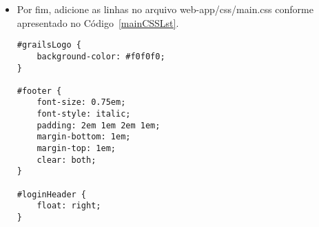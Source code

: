 \begin{itemize}
\begin{itemize}
\end{itemize}

\lstset{language=XML}
\begin{lstlisting}[numbers=left,        caption=Leiaute        padrão       {\bf
      grails-app/views/layouts/main.gsp}, frame=trBL,float=htbp, label=codMain] 
<!DOCTYPE html>
 <!--[if lt IE 7 ]> <html lang="en" class="no-js ie6"> <![endif]-->
 <!--[if IE 7 ]> <html lang="en" class="no-js ie7"> <![endif]-->
 <!--[if IE 8 ]> <html lang="en" class="no-js ie8"> <![endif]-->
 <!--[if IE 9 ]> <html lang="en" class="no-js ie9"> <![endif]-->
 <!--[if (gt IE 9)|!(IE)]><!--> <html lang="en" class="no-js"><!--<![endif]-->
 <head>
  <meta http-equiv="Content-Type" content="text/html; charset=UTF-8">
  <meta http-equiv="X-UA-Compatible" content="IE=edge,chrome=1">
  <title><g:layoutTitle default="Controle Banc^á^rio"/></title>
  <meta name="viewport" content="width=device-width, initial-scale=1.0">
  <link rel="shortcut icon" href="${resource(dir: 'images', file: 'favicon.ico')}" type="image/x-icon">
  <link rel="apple-touch-icon" href="${resource(dir: 'images', file: 'apple-touch-icon.png')}">
  <link rel="apple-touch-icon" sizes="114x114" href="${resource(dir:'images',file:'apple-touch-icon-retina.png')}">
  <link rel="stylesheet" href="${resource(dir: 'css', file: 'main.css')}" type="text/css">
  <link rel="stylesheet" href="${resource(dir:'css',file:'mobile.css')}" type="text/css">
  <g:layoutHead/>
  <g:javascript library="application"/> 
  <r:layoutResources />
 </head>
 <body>
  <div id="grailsLogo" role="banner">
    <img src="${resource(dir: 'images', file: 'Controle.png')}" alt="Grails"/>
  </div>
  <g:render template="/layouts/header" />
  <g:layoutBody />
  <g:render template="/layouts/footer" />
  <div class="footer" role="contentinfo"></div>
  <div id="spinner" class="spinner" style="display:none;">
    <g:message code="spinner.alt" default="Loading&hellip;"/>
  </div>
  <r:layoutResources />
 </body>
</html>
\end{lstlisting}

\item Por fim, adicione as linhas no arquivo web-app/css/main.css conforme apresentado no Código~\ref{mainCSSLst}.

\lstset{language=XML}
\begin{lstlisting}[caption=Arquivo   {\bf   web-app/css/main.css},   frame=trBL,
    float=htbp, label=mainCSSLst] 
#grailsLogo {
	background-color: #f0f0f0;
}

#footer {
    font-size: 0.75em;
    font-style: italic;
    padding: 2em 1em 2em 1em;
    margin-bottom: 1em;
    margin-top: 1em;
    clear: both;
}

#loginHeader {
    float: right;
}
\end{lstlisting}

\end{itemize}


